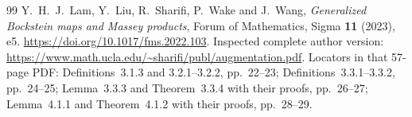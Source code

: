 \documentclass[11pt,a4paper]{article}
\theoremstyle{definition}
\begin{document}
\begin{thebibliography}{99}
Y.~H.~J.~Lam, Y.~Liu, R.~Sharifi, P.~Wake and J.~Wang,
\emph{Generalized Bockstein maps and Massey products},
Forum of Mathematics, Sigma \textbf{11} (2023), e5.
\url{https://doi.org/10.1017/fms.2022.103}.
Inspected complete author version:
\url{https://www.math.ucla.edu/~sharifi/publ/augmentation.pdf}.
Locators in that 57-page PDF: Definitions~3.1.3 and
3.2.1--3.2.2, pp.~22--23; Definitions~3.3.1--3.3.2,
pp.~24--25; Lemma~3.3.3 and Theorem~3.3.4 with their proofs,
pp.~26--27; Lemma~4.1.1 and Theorem~4.1.2 with their proofs,
pp.~28--29.

\end{thebibliography}
\end{document}

